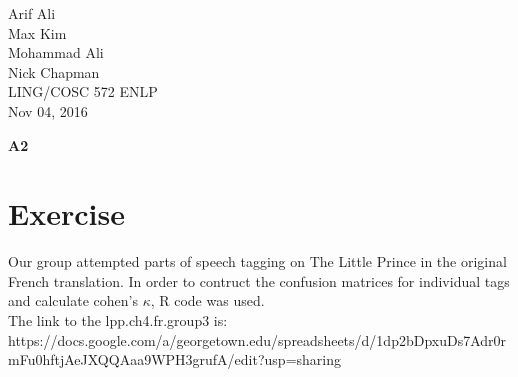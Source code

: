 \documentclass{article}\usepackage[]{graphicx}\usepackage[]{color}
\begin{document}
\begin{flushright}
Arif Ali\\
Max Kim\\
Mohammad Ali\\
Nick Chapman\\
LING/COSC 572 ENLP\\
Nov 04, 2016\\
\end{flushright}
\begin{center}
\LARGE\textbf{A2}
  \end{center}

\section*{Exercise}  
Our group attempted parts of speech tagging on The Little Prince in the original French translation. In order to contruct the confusion matrices for individual tags and calculate cohen's $\kappa$, R code was used.
\\
The link to the lpp.ch4.fr.group3 is:\\
https://docs.google.com/a/georgetown.edu/spreadsheets/d/1dp2bDpxuDs7Adr0rmFu0hftjAeJXQQAaa9WPH3grufA/edit?usp=sharing
\end{document}
